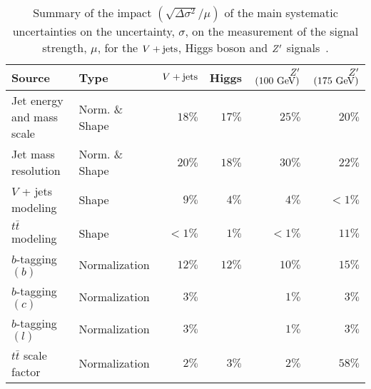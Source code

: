 \begin{table}[htpb]
 \centering
 \caption{Summary of the impact $(\sqrt{\Delta \sigma^2}/\mu)$ of the main systematic uncertainties on the uncertainty, $\sigma$, on the measurement of the signal strength, $\mu$, for the $V + \text{jets}$, Higgs boson and $Z'$ signals~\cite{ATLAS-CONF-2018-052}.}
 \begin{tabular}{@{}llrrrr@{}}
  \toprule
  Source                    & Type           & $V + \text{jets}$ & Higgs  & $Z'$ $\left(100~\mathrm{GeV}\right)$ & $Z'$ $\left(175~\mathrm{GeV}\right)$ \\ \midrule
  Jet energy and mass scale & Norm. \& Shape & $18\%$   & $17\%$ &
  $25\%$                    & $20\%$                                                                                                     \\
  Jet mass resolution       & Norm. \& Shape & $20\%$   & $18\%$ & $30\% $
                            & $22\% $                                                                                                    \\
  $V$ + jets modeling       & Shape          & $9\%$    & $4\%$  & $4\%$
                            & $<1\%$                                                                                                     \\
  $t\bar{t}$ modeling       & Shape          & $<1\%$   & $1\%$  & $<1\%$                            &
  $11\%$                                                                                                                                 \\
  $b$-tagging $(b)$         & Normalization  & $12\%$   & $12\%$ & $10\%$                            &
  $15\%$                                                                                                                                 \\
  $b$-tagging $(c)$         & Normalization  & $3\%$    &        & $1\%$
                            & $3\%$                                                                                                      \\
  $b$-tagging $(l)$         & Normalization  & $3\%$    &        & $1\%$
                            & $3\%$                                                                                                      \\
  $t\bar{t}$ scale factor   & Normalization  & $2\%$    & $3\%$  & $2\%$
                            & $58\%$                                                                                                     \\

\end{tabular}
\end{table}

